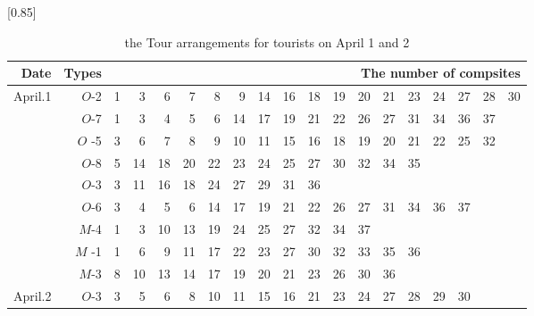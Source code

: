 	\begin{table}[H]
		\centering
		\caption{the Tour arrangements for tourists on April 1 and 2 
		}
		\scalebox{0.85}[0.85]{
			\begin{tabular}{|r|r|r|r|r|r|r|r|r|r|r|r|r|r|r|r|r|r|r|}
				\toprule
				\multicolumn{1}{|p{1em}|}{Date} & \multicolumn{1}{p{2em}|}{Types} & \multicolumn{17}{p{25em}|}{\centering The number of compsites} \\
				\midrule
				\multicolumn{1}{|r|}{\multirow{9}[18]{*}{April.1}} &  $O$-2    & 1     & 3     & 6     & 7     & 8     & 9     & 14    & 16    & 18    & 19    & 20    & 21    & 23    & 24    & 27    & 28    & 30 \\
				\cmidrule{2-19}         & $O$-7    & 1     & 3     & 4     & 5     & 6     & 14    & 17    & 19    & 21    & 22    & 26    & 27    & 31    & 34    & 36    & 37    &  \\
				\cmidrule{2-19}          &$O$ -5    & 3     & 6     & 7     & 8     & 9     & 10    & 11    & 15    & 16    & 18    & 19    & 20    & 21    & 22    & 25    & 32    &  \\
				\cmidrule{2-19}          & $O$-8    & 5     & 14    & 18    & 20    & 22    & 23    & 24    & 25    & 27    & 30    & 32    & 34    & 35    &       &       &       &  \\
				\cmidrule{2-19}          & $O$-3    & 3     & 11    & 16    & 18    & 24    & 27    & 29    & 31    & 36    &       &       &       &       &       &       &       &  \\
				\cmidrule{2-19}          & $O$-6    & 3     & 4     & 5     & 6     & 14    & 17    & 19    & 21    & 22    & 26    & 27    & 31    & 34    & 36    & 37    &       &  \\
				\cmidrule{2-19}          & $M$-4    & 1     & 3     & 10    & 13    & 19    & 24    & 25    & 27    & 32    & 34    & 37    &       &       &       &       &       &  \\
				\cmidrule{2-19}          &$M$ -1    & 1     & 6     & 9     & 11    & 17    & 22    & 23    & 27    & 30    & 32    & 33    & 35    & 36    &       &       &       &  \\
				\cmidrule{2-19}          & $M$-3    & 8     & 10    & 13    & 14    & 17    & 19    & 20    & 21    & 23    & 26    & 30    & 36    &       &       &       &       &  \\
				\midrule
				\multicolumn{1}{|r|}{\multirow{11}[22]{*}{April.2}} & $O$-3    & 3     & 5     & 6     & 8     & 10    & 11    & 15    & 16    & 21    & 23    & 24    & 27    & 28    & 29    & 30    &       &  \\

\end{tabular}}
\end{table}
